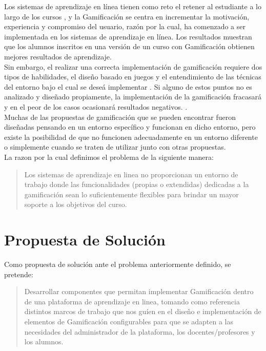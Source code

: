 Los sistemas de aprendizaje en línea tienen como reto el retener al estudiante a lo largo de los cursos \cite{DropOut}, y la Gamificación se centra en incrementar la motivación, experiencia y compromiso del usuario, razón por la cual, ha comenzado a ser implementada en los sistemas de aprendizaje en línea. Los resultados muestran que los alumnos inscritos en una versión de un curso con Gamificación obtienen mejores resultados de aprendizaje. \cite{GamInE-Learning}\\

\noindent Sin embargo, el realizar una correcta implementación de gamificación requiere dos tipos de habilidades, el diseño basado en juegos y el entendimiento de las técnicas del entorno bajo el cual se deseá implementar \cite[p. 7]{FrameWorkForTheWin}. Si alguno de estos puntos no es analizado y diseñado propiamente, la implementación de la gamificación fracasará y en el peor de los casos ocasionará resultados negativos. \cite{Wood-Reiners}.\\

\noindent Muchas de las propuestas de gamificación que se pueden encontrar fueron diseñadas pensando en un entorno específico y funcionan en dicho entorno, pero existe la posibilidad de que no funcionen adecuadamente en un entorno diferente o simplemente cuando se traten de utilizar junto con otras propuestas.\\

    \noindent La razon por la cual definimos el problema de la siguiente manera:

    \begin{quote}
    \colorbox{blue!05}{\parbox{\dimexpr\linewidth-2\fboxsep}{\strut%
        Los sistemas de aprendizaje en linea no proporcionan un entorno
        de trabajo donde las funcionalidades (propias o extendidas) dedicadas
        a la gamificación sean lo suficientemente flexibles para brindar un
        mayor soporte a los objetivos del curso.
    \strut}}%
    \end{quote}
    

\section{Propuesta de Solución}
\label{sec:propuesta}

    \noindent Como propuesta de solución ante el problema anteriormente definido, se pretende:
    
    \begin{quote}
    \colorbox{blue!05}{\parbox{\dimexpr\linewidth-2\fboxsep}{\strut%
        Desarrollar componentes que permitan implementar Gamificación dentro
        de una plataforma de aprendizaje en linea, tomando como referencia 
        distintos marcos de trabajo que nos guíen en el diseño e implementación
        de elementos de Gamificación configurables para que se adapten a las 
        necesidades del administrador de la plataforma, los docentes/profesores y 
        los alumnos.
    \strut}}%
    \end{quote}
    
